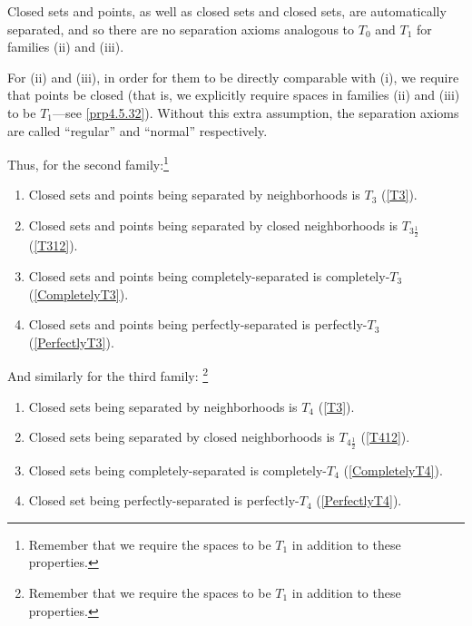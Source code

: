 Closed sets and points, as well as closed sets and closed sets, are automatically separated, and so there are no separation axioms analogous to $T_0$ and $T_1$ for families (ii) and (iii).

For (ii) and (iii), in order for them to be directly comparable with (i), we require that points be closed (that is, we explicitly require spaces in families (ii) and (iii) to be $T_1$---see \cref{prp4.5.32}).  Without this extra assumption, the separation axioms are called ``regular'' and ``normal'' respectively.

Thus, for the second family:\footnote{Remember that we require the spaces to be $T_1$ in addition to these properties.}
\begin{enumerate}
\item Closed sets and points being separated by neighborhoods is $T_3$ (\cref{T3}).
\item Closed sets and points being separated by closed neighborhoods is $T_{3\frac{1}{2}}$ (\cref{T312}).
\item Closed sets and points being completely-separated is completely-$T_3$ (\cref{CompletelyT3}).
\item Closed sets and points being perfectly-separated is perfectly-$T_3$ (\cref{PerfectlyT3}).
\end{enumerate}

And similarly for the third family:
\footnote{Remember that we require the spaces to be $T_1$ in addition to these properties.}
\begin{enumerate}
\item Closed sets being separated by neighborhoods is $T_4$ (\cref{T3}).
\item Closed sets being separated by closed neighborhoods is $T_{4\frac{1}{2}}$ (\cref{T412}).
\item Closed sets being completely-separated is completely-$T_4$ (\cref{CompletelyT4}).
\item Closed set being perfectly-separated is perfectly-$T_4$ (\cref{PerfectlyT4}).
\end{enumerate}

